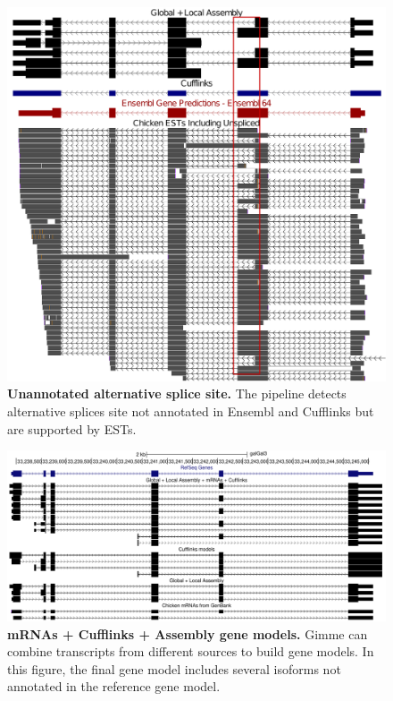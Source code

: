 \documentclass[10pt]{article}
\begin{document}
\begin{figure}[!ht]
\begin{center}
\includegraphics[width=5in]{alt_splice_site.pdf}
\end{center}
\caption{
{\bf Unannotated alternative splice site.}
The pipeline detects alternative splices site not annotated in Ensembl and Cufflinks but are supported by ESTs.
}
\label{alt_splice_site}
\end{figure}

\begin{figure}[!ht]
\begin{center}
\includegraphics[width=5in]{mrna_cuff_gimme.pdf}
\end{center}
\caption{
{\bf mRNAs + Cufflinks + Assembly gene models.}
Gimme can combine transcripts from different sources to build gene models.
In this figure, the final gene model includes several isoforms not annotated in the reference gene model.
}
\label{mrna_cuff_gimme}
\end{figure}
\end{document}
